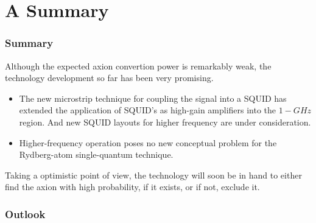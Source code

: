 \documentclass{beamer}
\begin{document}
\section{A Summary}
\begin{frame}
  \frametitle{Summary}
  Although the expected axion convertion power is remarkably weak, the
  technology development so far has been very promising.
  \begin{itemize}
  \item The new microstrip technique for coupling the signal into a SQUID has
    extended the application of SQUID’s as high-gain amplifiers into the
    $1-GHz$ region. And new SQUID layouts for higher frequency are under
    consideration. 
  \item Higher-frequency operation poses no new conceptual problem for the
    Rydberg-atom single-quantum technique. 
  \end{itemize}
  Taking a optimistic point of view,  the technology will soon be in hand to
  either find the axion with high probability, if it exists, or if not,
  exclude it.
\end{frame}
\begin{frame}
  \frametitle{Outlook}
  
\end{frame}
\end{document}
